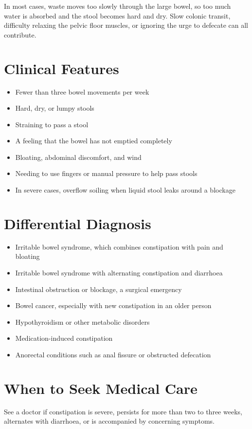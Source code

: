In most cases, waste moves too slowly through the large bowel, so too much water is absorbed and the stool becomes hard and dry. Slow colonic transit, difficulty relaxing the pelvic floor muscles, or ignoring the urge to defecate can all contribute.

\section*{Clinical Features}
\begin{itemize}
    \item Fewer than three bowel movements per week
    \item Hard, dry, or lumpy stools
    \item Straining to pass a stool
    \item A feeling that the bowel has not emptied completely
    \item Bloating, abdominal discomfort, and wind
    \item Needing to use fingers or manual pressure to help pass stools
    \item In severe cases, overflow soiling when liquid stool leaks around a blockage
\end{itemize}

\section*{Differential Diagnosis}
\begin{itemize}
    \item Irritable bowel syndrome, which combines constipation with pain and bloating
    \item Irritable bowel syndrome with alternating constipation and diarrhoea
    \item Intestinal obstruction or blockage, a surgical emergency
    \item Bowel cancer, especially with new constipation in an older person
    \item Hypothyroidism or other metabolic disorders
    \item Medication-induced constipation
    \item Anorectal conditions such as anal fissure or obstructed defecation
\end{itemize}

\section*{When to Seek Medical Care}
See a doctor if constipation is severe, persists for more than two to three weeks, alternates with diarrhoea, or is accompanied by concerning symptoms.


